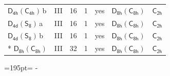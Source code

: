 \documentclass[10pt,a4paper]{article}
\newcommand{\needspace}[1]{\par\penalty-100\begingroup\dimen0=#1\relax\dimen2=\pagegoal
  \advance\dimen2-\pagetotal\ifdim\dimen0>\dimen2\relax\ifdim\dimen2>0pt\vfil\break\fi\fi
  \endgroup}
\numberwithin{equation}{section}
\newcommand{\grp}[1]{\mathsf{#1}}
\newcommand{\clsletter}[1]{\,{\scriptsize\color{black!55}#1}}
\begin{document}
{\begin{longtable}{@{}llrrlll@{}}
\href{D4h-C4h.pdf}{$\grp{D_{4h}}(\grp{C_{4h}})$}\clsletter{b} & III & 16 & 1 & yes & \href{D8h-C8h.pdf}{$\grp{D_{8h}}(\grp{C_{8h}})$} & \href{../../../rotation/data/pdf/C2h.pdf}{$\grp{C_{2h}}$}\\
\href{D4d-S8.pdf}{$\grp{D_{4d}}(\grp{S_{8}})$}\clsletter{a} & III & 16 & 1 & yes & \href{D8h-C8h.pdf}{$\grp{D_{8h}}(\grp{C_{8h}})$} & \href{../../../rotation/data/pdf/C2h.pdf}{$\grp{C_{2h}}$}\\
\href{D4d-S8.pdf}{$\grp{D_{4d}}(\grp{S_{8}})$}\clsletter{b} & III & 16 & 1 & yes & \href{D8h-C8h.pdf}{$\grp{D_{8h}}(\grp{C_{8h}})$} & \href{../../../rotation/data/pdf/C2h.pdf}{$\grp{C_{2h}}$}\\*
\href{D8h-C8h.pdf}{$\grp{D_{8h}}(\grp{C_{8h}})$} & III & 32 & 1 & yes & \href{D8h-C8h.pdf}{$\grp{D_{8h}}(\grp{C_{8h}})$} & \href{../../../rotation/data/pdf/C2h.pdf}{$\grp{C_{2h}}$}\\
\bottomrule\end{longtable}}
\needspace{195pt}
\end{document}
